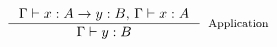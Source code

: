 \documentclass[preview]{standalone}
\begin{document}
$\inference {\Gamma \vdash x : A \rightarrow y : B, \, \Gamma \vdash x : A}{\Gamma \vdash y : B }[Application]$
\end{document}
